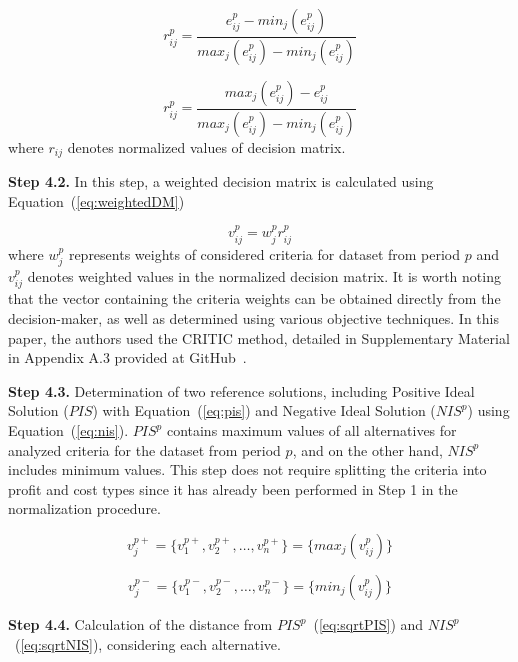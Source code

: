 \documentclass[final,5p,times,twocolumn,authoryear]{elsarticle}
\begin{document}
\begin{equation}
    r_{ij}^{p} = \frac{e_{ij}^{p} - min_{j}(e_{ij}^{p})}{max_{j}(e_{ij}^{p})-min_{j}(e_{ij}^{p})} \label{eq:minmaxProfit}
\end{equation}

\begin{equation}
    r_{ij}^{p} = \frac{max_{j}(e_{ij}^{p}) - e_{ij}^{p}}{max_{j}(e_{ij}^{p})-min_{j}(e_{ij}^{p})} \label{eq:minmaxCost}
\end{equation}
%
where $r_{ij}$ denotes normalized values of decision matrix.

\textbf{Step 4.2.} In this step, a weighted decision matrix is calculated using Equation~(\ref{eq:weightedDM})

\begin{equation}
    v_{ij}^{p} = w_{j}^{p}r_{ij}^{p} \label{eq:weightedDM}
\end{equation}
%
where $w_{j}^{p}$ represents weights of considered criteria for dataset from period $p$ and $v_{ij}^{p}$ denotes weighted values in the normalized decision matrix. It is worth noting that the vector containing the criteria weights can be obtained directly from the decision-maker, as well as determined using various objective techniques. In this paper, the authors used the CRITIC method, detailed in Supplementary Material in Appendix A.3 provided at GitHub~\citep{dariagithub2022}.

\textbf{Step 4.3.} Determination of two reference solutions, including Positive Ideal Solution ($PIS$) with Equation~(\ref{eq:pis}) and Negative Ideal Solution ($NIS^{p}$) using Equation~(\ref{eq:nis}). $PIS^{p}$ contains maximum values of all alternatives for analyzed criteria for the dataset from period $p$, and on the other hand, $NIS^{p}$ includes minimum values. This step does not require splitting the criteria into profit and cost types since it has already been performed in Step 1 in the normalization procedure. 

\begin{equation}
v_{j}^{p+} = \{v_{1}^{p+}, v_{2}^{p+}, \ldots, v_{n}^{p+}\} = \{max_{j}(v_{ij}^{p})\} \label{eq:pis}
\end{equation}

\begin{equation}
v_{j}^{p-} = \{v_{1}^{p-}, v_{2}^{p-}, \ldots, v_{n}^{p-}\} = \{min_{j}(v_{ij}^{p})\} \label{eq:nis}
\end{equation}

\textbf{Step 4.4.} Calculation of the distance from $PIS^{p}$~(\ref{eq:sqrtPIS}) and $NIS^{p}$~(\ref{eq:sqrtNIS}), considering each alternative.
\end{document}
